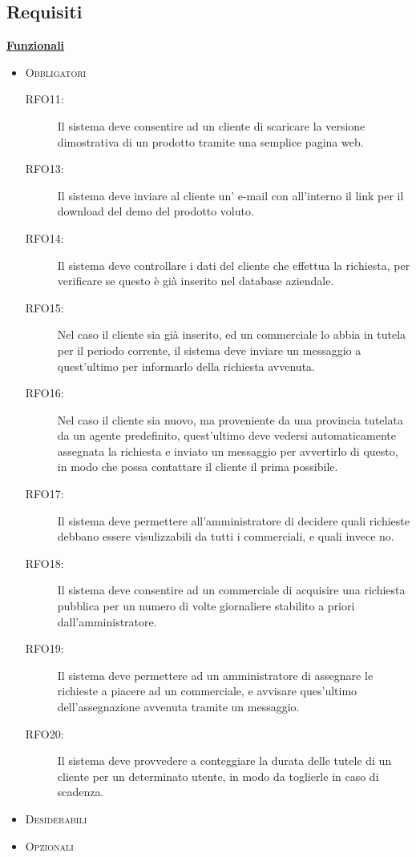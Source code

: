 \subsection{Requisiti}
\underline{\textbf{Funzionali}}
\begin{itemize}
 \item \textsc{Obbligatori}
	 \begin{description}
	  \item[RFO11:] Il sistema deve consentire ad un cliente di scaricare la versione dimostrativa di un prodotto tramite una semplice
pagina web.
	  \item[RFO13:] Il sistema deve inviare al cliente un' e-mail con all'interno il link per il download del demo del prodotto voluto.
	  \item[RFO14:] Il sistema deve controllare i dati del cliente che effettua la richiesta, per verificare se questo \`e gi\`a 
inserito nel database aziendale.
\item[RFO15:] Nel caso il cliente sia gi\`a inserito, ed un commerciale lo abbia in tutela per il periodo corrente, il sistema deve inviare un messaggio
a quest'ultimo per informarlo della richiesta avvenuta.
\item[RFO16:] Nel caso il cliente sia nuovo, ma proveniente da una provincia tutelata da un agente predefinito, quest'ultimo deve vedersi 
automaticamente assegnata la richiesta e inviato un messaggio per avvertirlo di questo, in modo che possa contattare il cliente il prima
possibile.
\item[RFO17:] Il sistema deve permettere all'amministratore di decidere quali richieste debbano essere visulizzabili da tutti i commerciali, 
e quali invece no.
\item[RFO18:] Il sistema deve consentire ad un commerciale di acquisire una richiesta pubblica per un numero di volte giornaliere stabilito 
a priori dall'amministratore.
\item[RFO19:] Il sistema deve permettere ad un amministratore di assegnare le richieste a piacere ad un commerciale, e avvisare ques'ultimo 
dell'assegnazione avvenuta tramite un messaggio.
\item[RFO20:] Il sistema deve provvedere a conteggiare la durata delle tutele di un cliente per un determinato utente, in modo da toglierle in 
caso di scadenza.
 	\end{description}

\item \textsc{Desiderabili}
\item \textsc{Opzionali}


\end{itemize}

